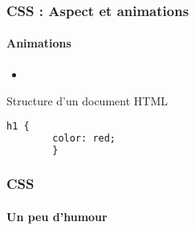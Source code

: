 \documentclass[xcolor=table]{beamer}
\begin{document}
\begin{frame}[fragile]
\frametitle{CSS : Aspect et animations}
\framesubtitle{Animations}

\begin{minipage}{0.60\textwidth}
	\begin{itemize}
		\item 
	\end{itemize}
\end{minipage}
%
\begin{minipage}{0.38\textwidth}
	\begin{block}{Structure d'un document HTML}
		\lstset{escapeinside=**}
		\scriptsize\bfseries
		\begin{lstlisting}[language={html}]
		h1 {
		color: red;
		}
		\end{lstlisting}
	\end{block}
\end{minipage}
\end{frame}


\begin{frame}
\frametitle{CSS}
\framesubtitle{Un peu d'humour}

\begin{center}
\end{center}

\end{frame}

\end{document}
